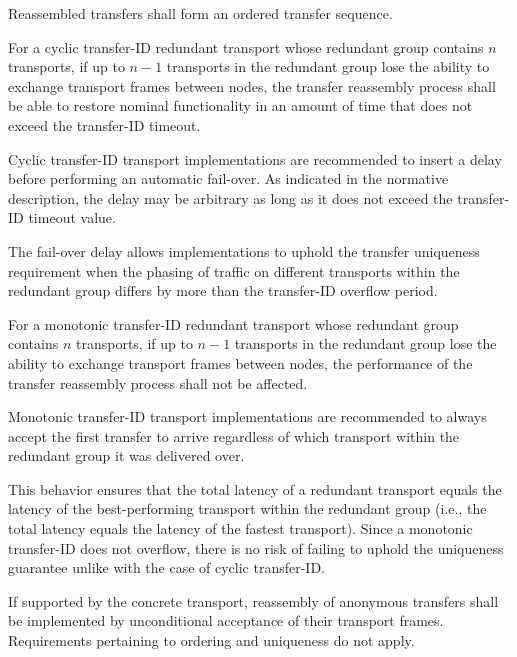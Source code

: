 Reassembled transfers shall form an ordered transfer sequence.

For a cyclic transfer-ID redundant transport whose redundant group contains $n$ transports,
if up to $n-1$ transports in the redundant group lose the ability to exchange transport frames between nodes,
the transfer reassembly process shall be able to restore nominal functionality
in an amount of time that does not exceed the transfer-ID timeout.

\begin{remark}
    Cyclic transfer-ID transport implementations are recommended to insert a delay before performing
    an automatic fail-over.
    As indicated in the normative description, the delay may be arbitrary as long as it does not exceed the
    transfer-ID timeout value.

    The fail-over delay allows implementations to uphold the transfer uniqueness requirement when the phasing of
    traffic on different transports within the redundant group differs by more than the transfer-ID overflow period.
\end{remark}

For a monotonic transfer-ID redundant transport whose redundant group contains $n$ transports,
if up to $n-1$ transports in the redundant group lose the ability to exchange transport frames between nodes,
the performance of the transfer reassembly process shall not be affected.

\begin{remark}
    Monotonic transfer-ID transport implementations are recommended to always accept the first transfer
    to arrive regardless of which transport within the redundant group it was delivered over.

    This behavior ensures that the total latency of a redundant transport equals the latency of the best-performing
    transport within the redundant group (i.e., the total latency equals the latency of the fastest transport).
    Since a monotonic transfer-ID does not overflow, there is no risk of failing to uphold the uniqueness guarantee
    unlike with the case of cyclic transfer-ID.
\end{remark}

If supported by the concrete transport,
reassembly of anonymous transfers shall be implemented by unconditional acceptance of their transport frames.
Requirements pertaining to ordering and uniqueness do not apply.

